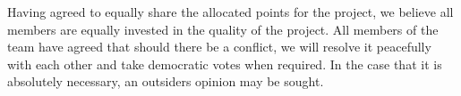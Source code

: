 Having agreed to equally share the allocated points for the project, we believe all members are equally invested in the quality of the project. All members of the team have agreed that should there be a conflict, we will resolve it peacefully with each other and take democratic votes when required. In the case that it is absolutely necessary, an outsiders opinion may be sought. 
